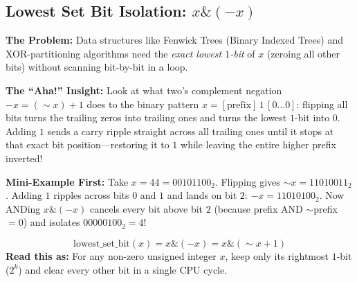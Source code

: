 \documentclass[11pt,a4paper]{article}
\theoremstyle{definition}
\newcommand{\painbeat}{\textbf{\color{accentamber}The Problem:} }
\newcommand{\ahabeat}{\textbf{\color{accentteal}The ``Aha!'' Insight:} }
\newcommand{\examplebeat}{\textbf{\color{primaryblue}Mini-Example First:} }
\begin{document}
\subsection{Lowest Set Bit Isolation: \texorpdfstring{$x \mathbin{\&} (-x)$}{x \& (-x)}}

\painbeat Data structures like Fenwick Trees (Binary Indexed Trees) and XOR-partitioning algorithms need the \emph{exact lowest $1$-bit} of $x$ (zeroing all other bits) without scanning bit-by-bit in a loop.

\ahabeat Look at what two's complement negation $-x = (\sim x) + 1$ does to the binary pattern $x = [\text{prefix}]\,1\,[0\dots 0]$: flipping all bits turns the trailing zeros into trailing ones and turns the lowest $1$-bit into $0$. Adding $1$ sends a carry ripple straight across all trailing ones until it stops at that exact bit position---restoring it to $1$ while leaving the entire higher prefix inverted!

\examplebeat Take $x = 44 = 00101100_2$. Flipping gives $\sim x = 11010011_2$. Adding $1$ ripples across bits $0$ and $1$ and lands on bit $2$: $-x = 11010100_2$. Now ANDing $x \mathbin{\&} (-x)$ cancels every bit above bit $2$ (because prefix AND $\sim$prefix $= 0$) and isolates $00000100_2 = 4$!

\begin{formulabox}
$$\text{lowest\_set\_bit}(x) = x \mathbin{\&} (-x) = x \mathbin{\&} (\sim x + 1)$$
\textbf{Read this as:} For any non-zero unsigned integer $x$, keep only its rightmost $1$-bit ($2^k$) and clear every other bit in a single CPU cycle.
\end{formulabox}
\end{document}

